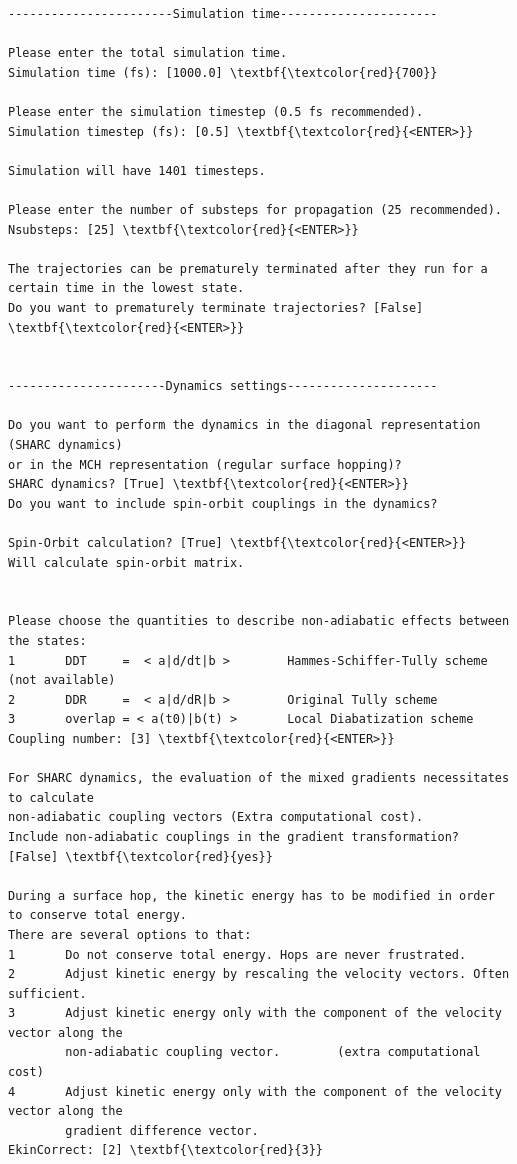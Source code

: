 \documentclass[a4paper,11pt,DIV=15,openany]{scrbook}
\begin{document}
\begin{oframed}
\begin{Verbatim}[commandchars=\\\{\}]
-----------------------Simulation time----------------------

Please enter the total simulation time.
Simulation time (fs): [1000.0] \textbf{\textcolor{red}{700}}

Please enter the simulation timestep (0.5 fs recommended).
Simulation timestep (fs): [0.5] \textbf{\textcolor{red}{<ENTER>}}

Simulation will have 1401 timesteps.

Please enter the number of substeps for propagation (25 recommended).
Nsubsteps: [25] \textbf{\textcolor{red}{<ENTER>}}

The trajectories can be prematurely terminated after they run for a certain time in the lowest state. 
Do you want to prematurely terminate trajectories? [False] \textbf{\textcolor{red}{<ENTER>}}


----------------------Dynamics settings---------------------

Do you want to perform the dynamics in the diagonal representation (SHARC dynamics) 
or in the MCH representation (regular surface hopping)?
SHARC dynamics? [True] \textbf{\textcolor{red}{<ENTER>}}
Do you want to include spin-orbit couplings in the dynamics?

Spin-Orbit calculation? [True] \textbf{\textcolor{red}{<ENTER>}}
Will calculate spin-orbit matrix.


Please choose the quantities to describe non-adiabatic effects between the states:
1       DDT     =  < a|d/dt|b >        Hammes-Schiffer-Tully scheme   (not available)
2       DDR     =  < a|d/dR|b >        Original Tully scheme          
3       overlap = < a(t0)|b(t) >       Local Diabatization scheme     
Coupling number: [3] \textbf{\textcolor{red}{<ENTER>}}

For SHARC dynamics, the evaluation of the mixed gradients necessitates to calculate 
non-adiabatic coupling vectors (Extra computational cost).
Include non-adiabatic couplings in the gradient transformation? [False] \textbf{\textcolor{red}{yes}}

During a surface hop, the kinetic energy has to be modified in order to conserve total energy. 
There are several options to that:
1       Do not conserve total energy. Hops are never frustrated.
2       Adjust kinetic energy by rescaling the velocity vectors. Often sufficient.
3       Adjust kinetic energy only with the component of the velocity vector along the 
        non-adiabatic coupling vector.        (extra computational cost)
4       Adjust kinetic energy only with the component of the velocity vector along the 
        gradient difference vector.
EkinCorrect: [2] \textbf{\textcolor{red}{3}}


\end{Verbatim}
\end{oframed}
\end{document}
